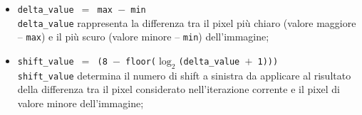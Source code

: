 \documentclass{article}
\begin{document}
\begin{itemize}
    \item   \texttt{delta\_value $=$ max $-$ min}\\
            \texttt{delta\_value} rappresenta la differenza tra il pixel più chiaro (valore maggiore – \texttt{max}) e il più scuro (valore minore – \texttt{min}) dell’immagine;
    \item   \texttt{shift\_value $=$ (8 $-$ floor\footnotemark($\log_{2} $(delta\_value $+$ 1)))}\\
            \texttt{shift\_value} determina il numero di shift a sinistra da applicare al risultato della differenza tra il pixel considerato nell’iterazione corrente e il pixel di valore minore dell’immagine;


\end{itemize}
\end{document}
